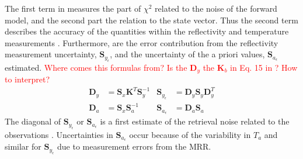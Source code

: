 %
The first term in  measures the part of $\chi^2$ related to the noise of the forward model, and the second part the relation to the state vector. Thus the second term describes the accuracy of the quantities within the reflectivity and temperature measurements \citep{rodgers_inverse_2000}.
Furthermore, are the error contribution from the reflectivity measurement uncertainty, $\mathbf{S}_{y_\epsilon}$, and the uncertainty of the a priori values, $\mathbf{S}_{a_\epsilon}$ estimated. \textcolor{red}{Where comes this formulas from? Is the $\mathbf{D}_y$ the $\mathbf{K}_b$ in Eq. 15 in \cite{wood_characterization_2013}? How to interpret?}
%
\begin{align}
	\mathbf{D}_y  & = \mathbf{S}_x \mathbf{K}^T \mathbf{S}_y^{-1} %
	& \mathbf{S}_{y_\epsilon} & = \mathbf{D}_y \mathbf{S}_y \mathbf{D}_y^T \\
	\mathbf{D}_a & = \mathbf{S}_x \mathbf{S}_a^{-1} %
	& \mathbf{S}_{a_\epsilon} & = \mathbf{D}_a \mathbf{S}_a
\end{align}
The diagonal of $\mathbf{S}_{y_\epsilon}$ or $\mathbf{S}_{a_\epsilon}$ is a first estimate of the retrieval noise related to the observations \citep{rodgers_inverse_2000}. Uncertainties in $\mathbf{S}_{a_\epsilon}$ occur because of the variability in $T_a$ and similar for $\mathbf{S}_{y_\epsilon}$ due to measurement errors from the MRR.
%
%
\newpage
